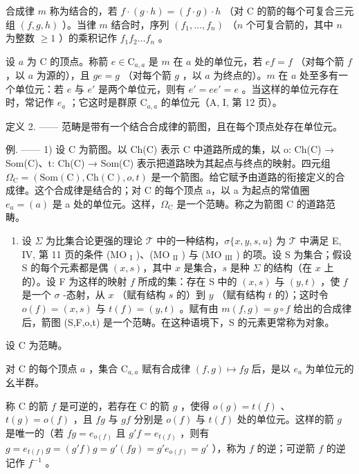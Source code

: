 合成律 \(m\) 称为结合的，若 \(f \cdot (g \cdot h) = (f \cdot g) \cdot h\) （对 C 的箭的每个可复合三元组 \((f, g, h)\) ）。当律 \(m\) 结合时，序列 \((f_1, \ldots, f_n)\) （\(n\) 个可复合箭的，其中 \(n\) 为整数 \(\geqslant 1\) ）的乘积记作 \(f_1 f_2 \ldots f_n\) 。

设 \(a\) 为 C 的顶点。称箭 \(e \in \mathrm{C}_{a,a}\) 是 \(m\) 在 \(a\) 处的单位元，若 \(ef = f\) （对每个箭 \(f\) ，以 \(a\) 为源的），且 \(ge = g\) （对每个箭 \(g\) ，以 \(a\) 为终点的）。\(m\) 在 \(a\) 处至多有一个单位元：若 \(e\) 与 \(e'\) 是两个单位元，则有 \(e' = ee' = e\) 。当这样的单位元存在时，常记作 \(e_a\) ；它这时是群原 \(\mathrm{C}_{a,a}\) 的单位元（A, I, 第 12 页）。

定义 2. —— 范畴是带有一个结合合成律的箭图，且在每个顶点处存在单位元。

例. —— 1) 设 C 为箭图。以 Ch(C) 表示 C 中道路所成的集，以 o: Ch(C) → Som(C)、t: Ch(C) → Som(C) 表示把道路映为其起点与终点的映射。四元组 \(\Omega_{\mathrm{C}} = (\mathrm{Som}(\mathrm{C}), \mathrm{Ch}(\mathrm{C}), o, t)\) 是一个箭图。给它赋予由道路的衔接定义的合成律。这个合成律是结合的；对 C 的每个顶点 a，以 a 为起点的常值圈 \(e_a = (a)\) 是 a 处的单位元。这样，\(\Omega_{\mathrm{C}}\) 是一个范畴。称之为箭图 C 的道路范畴。

\begin{enumerate}
\def\labelenumi{\arabic{enumi})}
\setcounter{enumi}{1}
\tightlist
\item
  设 \(\Sigma\) 为比集合论更强的理论 \(\mathcal{T}\) 中的一种结构，\(\sigma\{x,y,s,u\}\) 为 \(\mathcal{T}\) 中满足 E, IV, 第 11 页的条件 (MO \(_{\text{I}}\) )、(MO \(_{\text{II}}\) ) 与 (MO \(_{\text{III}}\) ) 的项。设 S 为集合；假设 S 的每个元素都是偶 \((x,s)\)，其中 \(x\) 是集合，\(s\) 是种 \(\Sigma\) 的结构（在 \(x\) 上的）。设 F 为这样的映射 \(f\) 所成的集：存在 S 中的 \((x,s)\) 与 \((y,t)\) ，使 \(f\) 是一个 \(\sigma\) -态射，从 \(x\) （赋有结构 \(s\) 的）到 \(y\) （赋有结构 \(t\) 的）；这时令 \(o(f) = (x,s)\) 与 \(t(f) = (y,t)\) 。赋有由 \(m(f,g)=g\circ f\) 给出的合成律后，箭图 (S,F,o,t) 是一个范畴。在这种语境下，S 的元素更常称为对象。
\end{enumerate}

设 C 为范畴。

对 C 的每个顶点 \(a\) ，集合 \(\mathrm{C}_{a,a}\) 赋有合成律 \((f,g)\mapsto fg\) 后，是以 \(e_a\) 为单位元的幺半群。

称 C 的箭 \(f\) 是可逆的，若存在 C 的箭 \(g\) ，使得 \(o(g) = t(f)\) 、\(t(g) = o(f)\) ，且 \(fg\) 与 \(gf\) 分别是 \(o(f)\) 与 \(t(f)\) 处的单位元。这样的箭 \(g\) 是唯一的（若 \(fg = e_{o(f)}\) 且 \(g'f = e_{t(f)}\) ，则有 \(g = e_{t(f)}g = (g'f)g = g'(fg) = g'e_{o(f)} = g'\) ），称为 \(f\) 的逆；可逆箭 \(f\) 的逆记作 \(f^{-1}\) 。

